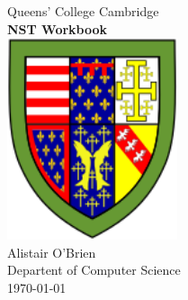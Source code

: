 \documentclass[12pt,oneside]{book}
\begin{document}
    \thispagestyle{empty}
    \begin{center}
        {\LARGE Queens' College Cambridge}\\[1.5cm]
        \linespread{1.2}\huge {\bfseries NST Workbook}\\[1.5cm]
        \linespread{1}
        \includegraphics[width=5cm]{images/Queens.png}\\[1cm]
        {\Large Alistair O'Brien}\\[1cm]
        {\Large Departent of Computer Science}\\[1.5cm]
        {\Large \today}
    \end{center}

    \newpage
\end{document}
